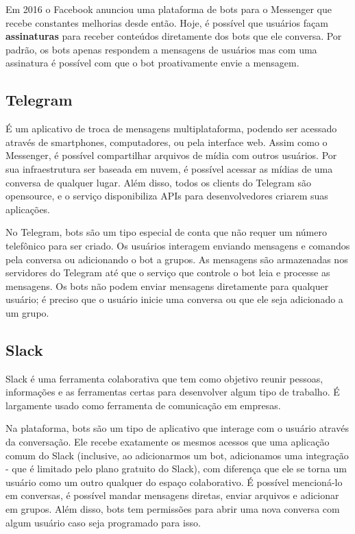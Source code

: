   Em 2016 o Facebook anunciou uma plataforma de bots para o Messenger que recebe constantes melhorias desde então. Hoje, é possível que usuários façam \textbf{assinaturas} para receber conteúdos diretamente dos bots que ele conversa. Por padrão, os bots apenas respondem a mensagens de usuários mas com uma assinatura é possível com que o bot proativamente envie a mensagem.
  
  \subsection{Telegram}
  É um aplicativo de troca de mensagens multiplataforma, podendo ser acessado através de smartphones, computadores, ou pela interface web. Assim como o Messenger, é possível compartilhar arquivos de mídia com outros usuários. Por sua infraestrutura ser baseada em nuvem, é possível acessar as mídias de uma conversa de qualquer lugar. Além disso, todos os clients do Telegram são opensource, e o serviço disponibiliza APIs para desenvolvedores criarem suas aplicações.
  
  No Telegram, bots são um tipo especial de conta que não requer um número telefônico para ser criado. Os usuários interagem enviando mensagens e comandos pela conversa ou adicionando o bot a grupos. As mensagens são armazenadas nos servidores do Telegram até que o serviço que controle o bot leia e processe as mensagens. Os bots não podem enviar mensagens diretamente para qualquer usuário; é preciso que o usuário inicie uma conversa ou que ele seja adicionado a um grupo.
  
  
  \subsection{Slack}
  Slack é uma ferramenta colaborativa que tem como objetivo reunir pessoas, informações e as ferramentas certas para desenvolver algum tipo de trabalho. É largamente usado como ferramenta de comunicação em empresas.
  
  Na plataforma, bots são um tipo de aplicativo que interage com o usuário através da conversação. Ele recebe exatamente os mesmos acessos que uma aplicação comum do Slack (inclusive, ao adicionarmos um bot, adicionamos uma integração - que é limitado pelo plano gratuito do Slack), com diferença que ele se torna um usuário como um outro qualquer do espaço colaborativo. É possível mencioná-lo em conversas, é possível mandar mensagens diretas, enviar arquivos e adicionar em grupos. Além disso, bots tem permissões para abrir uma nova conversa com algum usuário caso seja programado para isso.
  
